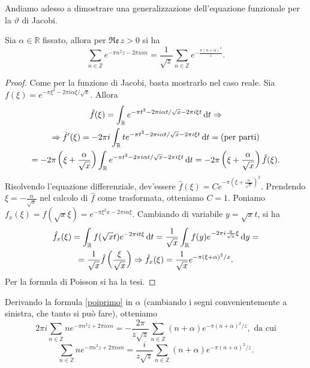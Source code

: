 Andiamo adesso a dimostrare una generalizzazione dell'equazione funzionale per la $\vartheta$ di Jacobi.

\begin{prop}
  Sia $\alpha \in \mathbb{R}$ fissato, allora per $\mathfrak{Re}\,z>0$ si ha
  \begin{equation} \label{poiprimo}
    \sum_{n \in \mathbb{Z}} e^{-\pi n^2z-2\pi i\alpha n}=\frac{1}{\sqrt{z}}\sum_{n \in \mathbb{Z}} e^{-\frac{\pi(n+\alpha)^2}{z}}.
  \end{equation}
\end{prop}

\begin{proof}
  Come per la funzione di Jacobi, basta mostrarlo nel caso reale. Sia $f(\xi)=e^{-\pi\xi^2-2\pi i\alpha\xi/\sqrt{x}}$. Allora
  \begin{gather*}
    \hat{f}(\xi)=\int_{\mathbb{R}} e^{-\pi t^2-2\pi i\alpha t/\sqrt{x}-2\pi i\xi t}\mathop{}\!\mathrm{d} t \Rightarrow \\
    \Rightarrow \hat{f}'(\xi)=-2\pi i\int_{\mathbb{R}} te^{-\pi t^2-2\pi i\alpha t/\sqrt{x}-2\pi i\xi t}\mathop{}\!\mathrm{d} t=\text{(per parti)}\\
    =-2\pi\left(\xi+\frac{\alpha}{\sqrt{x}}\right)\int_{\mathbb{R}} e^{-\pi t^2-2\pi i\alpha t/\sqrt{x}-2\pi i\xi t}\mathop{}\!\mathrm{d} t=-2\pi\left(\xi+\frac{\alpha}{\sqrt{x}}\right)\hat{f}(\xi).
  \end{gather*}
  Risolvendo l'equazione differenziale, dev'essere $\hat{f}(\xi)=Ce^{-\pi\left(\xi+\frac{\alpha}{\sqrt{x}}\right)^2}$. Prendendo $\xi=-\frac{\alpha}{\sqrt{x}}$ nel calcolo di $\hat{f}$ come trasformata, otteniamo $C=1$. Poniamo $f_x(\xi)=f(\sqrt{x}\xi)=e^{-\pi\xi^2x-2\pi i\alpha\xi}$. Cambiando di variabile $y=\sqrt{x}t$, si ha
  \begin{gather*}
    \hat{f}_x(\xi)=\int_{\mathbb{R}} f(\sqrt{x}t)e^{-2\pi it\xi}\mathop{}\!\mathrm{d} t=\frac{1}{\sqrt{x}} \int_{\mathbb{R}} f(y) e^{-2\pi i\frac{y}{\sqrt{x}}\xi}\mathop{}\!\mathrm{d} y=\\
    =\frac{1}{\sqrt{x}}\hat{f}\left(\frac{\xi}{\sqrt{x}}\right) \Rightarrow \hat{f}_x(\xi)=\frac{1}{\sqrt{x}}e^{-\pi(\xi+\alpha)^2/x}.
  \end{gather*}
  Per la formula di Poisson si ha la tesi.
\end{proof}

Derivando la formula \eqref{poiprimo} in $\alpha$ (cambiando i segni convenientemente a sinistra, che tanto si può fare), otteniamo
$$2\pi i \sum_{n \in \mathbb{Z}} ne^{-\pi n^2z+2\pi i\alpha n}=-\frac{2\pi}{z\sqrt{z}}\sum_{n \in \mathbb{Z}} (n+\alpha)e^{-\pi(n+\alpha)^2/z}, \text{ da cui}$$
\begin{equation} \label{poisecondo}
  \sum_{n \in \mathbb{Z}} ne^{-\pi n^2z+2\pi i\alpha n}=\frac{i}{z\sqrt{z}}\sum_{n \in \mathbb{Z}} (n+\alpha)e^{-\pi(n+\alpha)^2/z}.
\end{equation}
